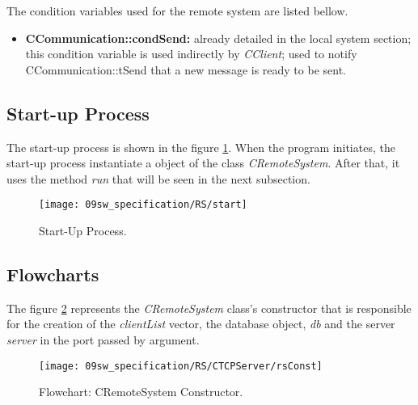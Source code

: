 
The condition variables used for the remote system are listed bellow.

\begin{itemize}
	\item \textbf{CCommunication::condSend:} already detailed in the local system
	section; this condition variable is used indirectly by \textit{CClient}; used to notify CCommunication::tSend that a new message is ready to be sent.
\end{itemize}


\subsection{Start-up Process}
The start-up process is shown in the figure \ref{fig:RSstart}. When the program initiates, the start-up process instantiate a object of the class \textit{CRemoteSystem}. After that, it uses the method \textit{run} that will be seen in the next subsection.

\begin{figure}[H]
	\centering
	\texttt{[image: 09sw\_specification/RS/start]}
	\caption{Start-Up Process.}
	\label{fig:RSstart}
\end{figure}

\subsection{Flowcharts}

The figure \ref{fig:rsConst} represents the \textit{CRemoteSystem} class's constructor that is responsible for the creation of the \textit{clientList} vector, the database object, \textit{db} and the server \textit{server} in the port passed by argument.

\begin{figure}[H]
	\centering
	\texttt{[image: 09sw\_specification/RS/CTCPServer/rsConst]}
	\caption{Flowchart: CRemoteSystem Constructor.}
	\label{fig:rsConst}
\end{figure}

